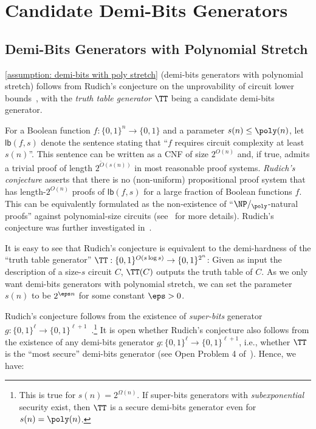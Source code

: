 \section{Candidate Demi-Bits Generators}\label{sec: candidate demi-bits}

\subsection{Demi-Bits Generators with Polynomial Stretch}
\autoref{assumption: demi-bits with poly stretch} (demi-bits generators with polynomial stretch) follows from Rudich's conjecture on the unprovability of circuit lower bounds~\cite{Rudich97}, with the \emph{truth table generator} $\TT$ being a candidate demi-bits generator.

\def\lb{\mathsf{lb}}
For a Boolean function $f: \{0, 1\}^n \to \{0, 1\}$ and a parameter $s(n) \le \poly(n)$, let $\lb(f, s)$ denote the sentence stating that ``$f$ requires circuit complexity at least $s(n)$''. This sentence can be written as a CNF of size $2^{O(n)}$ and, if true, admits a trivial proof of length $2^{\tilde{O}(s(n))}$ in most reasonable proof systems. \emph{Rudich's conjecture} asserts that there is no (non-uniform) propositional proof system that has length-$2^{O(n)}$ proofs of $\lb(f, s)$ for a large fraction of Boolean functions $f$. This can be equivalently formulated as the non-existence of ``$\NP/_{\poly}$-natural proofs'' against polynomial-size circuits (see~\cite{Rudich97} for more details). Rudich's conjecture was further investigated in~\cite{PichS19, SanthanamT21}.

It is easy to see that Rudich's conjecture is equivalent to the demi-hardness of the ``truth table generator'' $\TT:\{0, 1\}^{O(s\log s)} \to \{0, 1\}^{2^n}$: Given as input the description of a size-$s$ circuit $C$, $\TT(C)$ outputs the truth table of $C$. As we only want demi-bits generators with polynomial stretch, we can set the parameter $s(n)$ to be $2^{\eps n}$ for some constant $\eps > 0$. %

Rudich's conjecture follows from the existence of \emph{super-bits} generator $g: \{0, 1\}^\ell \to \{0, 1\}^{\ell+1}$~\cite{Rudich97,DBLP:journals/jacm/GoldreichGM86}.\footnote{This is true for $s(n) = 2^{\Omega(n)}$. If super-bits generators with \emph{subexponential} security exist, then $\TT$ is a secure demi-bits generator even for $s(n) = \poly(n)$.} It is open whether Rudich's conjecture also follows from the existence of any demi-bits generator $g: \{0, 1\}^\ell \to \{0, 1\}^{\ell + 1}$, i.e., whether $\TT$ is the ``most secure'' demi-bits generator (see Open Problem 4 of~\cite{Rudich97}). Hence, we have:

